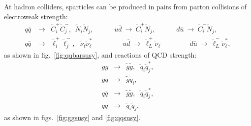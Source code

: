 \documentclass[11pt]{article}
\def\beq{\begin{eqnarray}}
\def\eeq{\end{eqnarray}}
\def\stilde{\widetilde}
\begin{document}
At hadron colliders, sparticles can be produced in pairs from parton 
collisions of electroweak strength:
\beq
q \overline q^{\phantom '}\! &\rightarrow & \stilde  
C_i^+ \stilde C_j^-, 
\>\>
\stilde N_i \stilde N_j,
\qquad\quad
u \overline d \>\rightarrow\>  \stilde C_i^+ \stilde N_j,
\qquad\quad
d \overline u \>\rightarrow\>  \stilde C_i^- \stilde N_j,
\label{eq:qqbarinos}
\\
q \overline q^{\phantom '}\! &\rightarrow & \stilde \ell^+_i \stilde \ell^-_j,
\>\>\>
\stilde \nu_\ell \stilde \nu^*_\ell
\qquad\qquad\>\>
u \overline d \>\rightarrow\>  \stilde \ell^+_L \stilde \nu_\ell
\qquad\qquad\>
d \overline u \>\rightarrow\>  \stilde \ell^-_L \stilde \nu^*_\ell,
\label{eq:qqbarsleptons}
\eeq
as shown in fig.~\ref{fig:qqbarsusy}, and reactions of QCD strength:
\beq
gg &\rightarrow & \stilde g \stilde g, 
\>\>\,
\stilde q_i \stilde q_j^*,
\label{eq:gluegluegluinos}
\\
gq &\rightarrow & \stilde g \stilde q_i,
\label{eq:gluequarkgluinosquark}
\\
q \overline q &\rightarrow& \stilde g \stilde g, 
\>\>\,
\stilde q_i \stilde q_j^*,
\label{eq:qqbargluinosorsquarks}
\\
q q &\rightarrow& \stilde q_i \stilde q_j,
\label{eq:qqsquarks}
\eeq
as shown in figs.~\ref{fig:ggsusy} and \ref{fig:qqsusy}.
\end{document}
